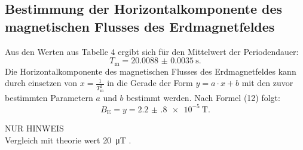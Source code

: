 \subsection{Bestimmung der Horizontalkomponente des magnetischen Flusses des Erdmagnetfeldes}

Aus den Werten aus Tabelle 4 ergibt sich für den Mittelwert der Periodendauer:
\begin{displaymath}
	T_\text{m} = \SI{20.0088(35)}{\second}\text{.}
\end{displaymath}
Die Horizontalkomponente des magnetischen Flusses des Erdmagnetfeldes kann durch einsetzen von $x=\frac{1}{T_\text{m}^2}$ in die Gerade der Form $y = a \cdot x +b$ mit den zuvor bestimmten Parametern $a$ und $b$ bestimmt werden. Nach Formel (12) folgt:
\begin{displaymath}
	B_\text{E} = y = \SI{ 2.2(8)e-5}{\tesla}\text{.}
\end{displaymath}

NUR HINWEIS\\
Vergleich mit theorie wert \SI{20}{\micro\tesla} \cite{Erdmagnetfeld}.
